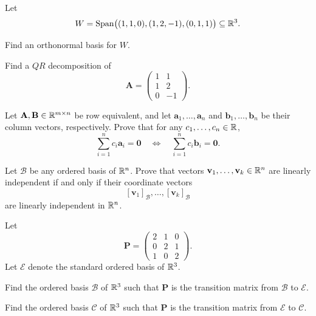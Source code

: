 \documentclass[11pt,oneside]{article}
\begin{document}
\begin{problem}
Let
\[
W=\operatorname{Span}\bigl((1,1,0),(1,2,-1),(0,1,1)\bigr)\subseteq\mathbb{R}^3.
\]
\begin{problemsubparts}
\item Find an orthonormal basis for $W$.
\item Find a $QR$ decomposition of
\[
\mathbf A=
\begin{pmatrix}
1&1\\
1&2\\
0&-1
\end{pmatrix}.
\]
\end{problemsubparts}
\end{problem}

\begin{problem}
Let $\mathbf A,\mathbf B\in\mathbb{R}^{m\times n}$ be row equivalent, and let $\mathbf a_1,\dots,\mathbf a_n$ and $\mathbf b_1,\dots,\mathbf b_n$ be their column vectors, respectively. Prove that for any $c_1,\dots,c_n\in\mathbb{R}$,
\[
\sum_{i=1}^n c_i\mathbf a_i=\mathbf0
\quad\Longleftrightarrow\quad
\sum_{i=1}^n c_i\mathbf b_i=\mathbf0.
\]
\end{problem}

\begin{problem}
Let $\mathcal B$ be any ordered basis of $\mathbb{R}^n$. Prove that vectors $\mathbf v_1,\dots,\mathbf v_k\in\mathbb{R}^n$ are linearly independent if and only if their coordinate vectors
\[
[\mathbf v_1]_{\mathcal B},\dots,[\mathbf v_k]_{\mathcal B}
\]
are linearly independent in $\mathbb{R}^n$.
\end{problem}

\begin{problem}
Let
\[
\mathbf P=
\begin{pmatrix}
2&1&0\\
0&2&1\\
1&0&2
\end{pmatrix}.
\]
Let $\mathcal E$ denote the standard ordered basis of $\mathbb{R}^3$.
\begin{problemsubparts}
\item Find the ordered basis $\mathcal B$ of $\mathbb{R}^3$ such that $\mathbf P$ is the transition matrix from $\mathcal B$ to $\mathcal E$.
\item Find the ordered basis $\mathcal C$ of $\mathbb{R}^3$ such that $\mathbf P$ is the transition matrix from $\mathcal E$ to $\mathcal C$.
\end{problemsubparts}
\end{problem}
\end{document}
